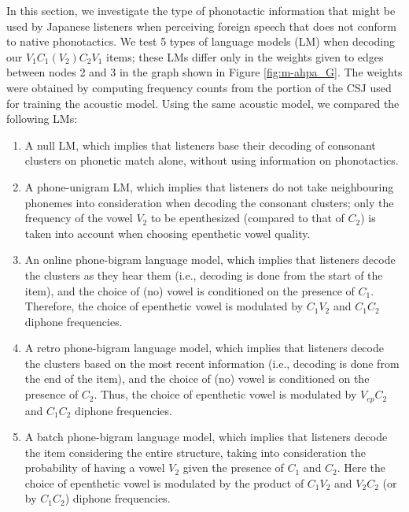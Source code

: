 {In this section, we investigate the type of phonotactic information that might be used by Japanese listeners when perceiving foreign speech that does not conform to native phonotactics. We test 5 types of language models (LM) when decoding our $V_{1}C_{1}(V_{2})C_{2}V_{1}$ items; these LMs differ only in the weights given to edges between nodes 2 and 3 in the graph shown in Figure \ref{fig:m-ahpa_G}. The weights were obtained by computing frequency counts from the portion of the CSJ used for training the acoustic model. Using the same acoustic model, we compared the following LMs: %

\begin{enumerate}
    \item A null LM, which implies that listeners base their decoding of consonant clusters on phonetic match alone, without using information on phonotactics.
    \item A phone-unigram LM, which implies that listeners do not take neighbouring phonemes into consideration when decoding the consonant clusters; only the frequency of the vowel $V_{2}$ to be epenthesized (compared to that of $C_{2}$) is taken into account when choosing epenthetic vowel quality.
    \item An online phone-bigram language model, which implies that listeners decode the clusters as they hear them (i.e., decoding is done from the start of the item), and the choice of (no) vowel is conditioned on the presence of $C_{1}$. Therefore, the choice of epenthetic vowel is modulated by $C_{1}V_{2}$ and $C_{1}C_{2}$ diphone frequencies. 
    \item A retro phone-bigram language model, which implies that listeners decode the clusters based on the most recent information (i.e., decoding is done from the end of the item), and the choice of (no) vowel is conditioned on the presence of $C_{2}$. Thus, the choice of epenthetic vowel is modulated by $V_{ep}C_{2}$ and $C_{1}C_{2}$ diphone frequencies.
    \item A batch phone-bigram language model, which implies that listeners decode the item considering the entire structure, taking into consideration the probability of having a vowel $V_{2}$ given the presence of $C_{1}$ and $C_{2}$. Here the choice of epenthetic vowel is modulated by the product of $C_{1}V_{2}$ and $V_{2}C_{2}$ (or by $C_{1}C_{2}$) diphone frequencies.  
\end{enumerate}
    
}
